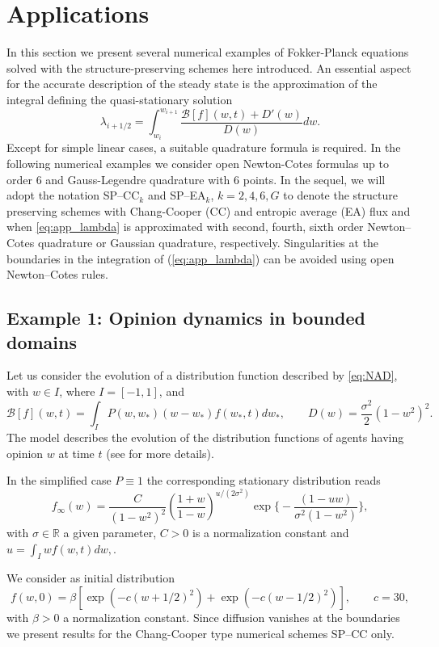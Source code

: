 \documentclass[a4paper]{article}
\theoremstyle{remark}\newtheorem{remark}{Remark}
\newcommand{\RR}{\mathbb{R}}
\newcommand{\B}{\mathcal{B}}
\newcommand{\be}{\begin{equation}}
\newcommand{\ee}{\end{equation}}
\begin{document}
\section{Applications}
\label{sec:applications}
In this section we present several numerical examples of Fokker-Planck equations solved with the structure-preserving schemes here introduced. An essential aspect for the accurate description of the steady state is the approximation of the integral defining the quasi-stationary solution
\begin{equation}\label{eq:app_lambda}
\lambda_{i+1/2} = \int_{w_i}^{w_{i+1}}\dfrac{\B[f](w,t)+D'(w)}{D(w)}dw.
\end{equation}
Except for simple linear cases, a suitable quadrature formula is required. In the following numerical examples we consider open Newton-Cotes formulas up to order 6 and Gauss-Legendre quadrature with $6$ points. 
In the sequel, we will adopt the notation SP--CC$_k$ and SP--EA$_k$, $k=2,4,6,G$ to denote the structure preserving schemes with Chang-Cooper (CC) and entropic average (EA) flux and when \eqref{eq:app_lambda} is approximated with second, fourth, sixth order Newton--Cotes quadrature or Gaussian quadrature, respectively.
Singularities at the boundaries in the integration of (\ref{eq:app_lambda}) can be avoided using open Newton--Cotes rules.

\subsection{Example 1: Opinion dynamics in bounded domains}
Let us consider the evolution of a distribution function described by \eqref{eq:NAD}, with $w\in I$, where $I=[-1,1]$, and
\be\label{eq:opinion_BD}
\B[f](w,t) = \int_I P(w,w_*)(w-w_*)f(w_*,t)dw_*, \qquad D(w)=\dfrac{\sigma^2}{2}(1-w^2)^2.
\ee
The model describes the evolution of the distribution functions of agents having opinion $w$ at time $t$ (see \cite{PT2,T} for more details).

In the simplified case $P\equiv 1$ the corresponding stationary distribution reads
\be\label{eq:opinion_stat}
f_{\infty}(w) = \dfrac{C}{(1-w^2)^2}\left(\dfrac{1+w}{1-w}\right)^{u/(2\sigma^2)}\exp\Big\{ -\dfrac{(1-uw)}{\sigma^2(1-w^2)} \Big\},
\ee
with $\sigma\in\RR$ a given parameter, $C>0$ is a normalization constant and $u=\int_I wf(w,t)dw,$. 

We consider as initial distribution
\be\label{eq:opinion_initial}
f(w,0) =\beta \left[ \exp\left(-c(w+1/2)^2\right)+\exp\left(-c(w-1/2)^2\right) \right], \qquad c = 30,
\ee
with $\beta>0$ a normalization constant. Since diffusion vanishes at the boundaries we present results for the Chang-Cooper type numerical schemes SP--CC only. 
\end{document}
